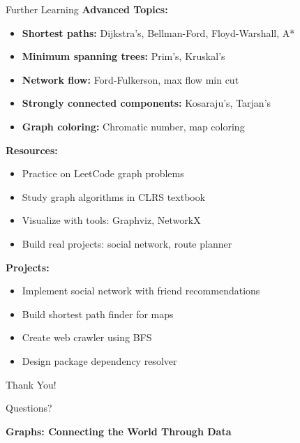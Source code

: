 \documentclass[aspectratio=169]{beamer}
\begin{document}
\begin{frame}{Further Learning}
  \textbf{Advanced Topics:}
  \begin{itemize}
    \item \textbf{Shortest paths:} Dijkstra's, Bellman-Ford, Floyd-Warshall, A*
    \item \textbf{Minimum spanning trees:} Prim's, Kruskal's
    \item \textbf{Network flow:} Ford-Fulkerson, max flow min cut
    \item \textbf{Strongly connected components:} Kosaraju's, Tarjan's
    \item \textbf{Graph coloring:} Chromatic number, map coloring
  \end{itemize}

  \vspace{0.3cm}
  \textbf{Resources:}
  \begin{itemize}
    \item Practice on LeetCode graph problems
    \item Study graph algorithms in CLRS textbook
    \item Visualize with tools: Graphviz, NetworkX
    \item Build real projects: social network, route planner
  \end{itemize}

  \vspace{0.3cm}
  \textbf{Projects:}
  \begin{itemize}
    \item Implement social network with friend recommendations
    \item Build shortest path finder for maps
    \item Create web crawler using BFS
    \item Design package dependency resolver
  \end{itemize}
\end{frame}

\begin{frame}
  \begin{center}
    {\Huge Thank You!}

    \vspace{1cm}
    {\Large Questions?}

    \vspace{1cm}
    \textbf{Graphs: Connecting the World Through Data}
  \end{center}
\end{frame}
\end{document}
